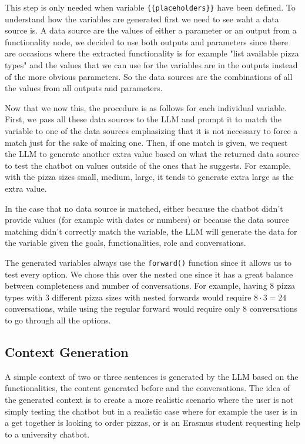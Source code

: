 This step is only needed when variable \texttt{\{\{placeholders\}\}} have been defined.
To understand how the variables are generated first we need to see waht a data source is.
A data source are the values of either a parameter or an output from a functionality node,
we decided to use both outputs and parameters since there are occasions
where the extracted functionality is for example "list available pizza types"
and the values that we can use for the variables
are in the outputs instead of the more obvious parameters.
So the data sources are the combinations of all the values
from all outputs and parameters.

Now that we now this, the procedure is as follows for each individual variable.
First, we pass all these data sources to the \ac{LLM}
and prompt it to match the variable to one of the data sources
emphasizing that it is not necessary to force a match
just for the sake of making one.
Then, if one match is given,
we request the \ac{LLM} to generate another extra value
based on what the returned data source
to test the chatbot on values outside of the ones that he suggests.
For example, with the pizza sizes small, medium, large,
it tends to generate extra large as the extra value.

In the case that no data source is matched,
either because the chatbot didn't provide values
(for example with dates or numbers)
or because the data source matching didn't correctly match the variable,
the \ac{LLM} will generate the data for the variable given
the goals, functionalities, role and conversations.

The generated variables always use the \texttt{forward()} function
since it allows us to test every option.
We chose this over the nested one
since it has a great balance between completeness and number of conversations.
For example, having $8$ pizza types with $3$ different pizza sizes
with nested forwards would require $8 \cdot 3 = 24$ conversations,
while using the regular forward would require only $8$ conversations
to go through all the options.

\subsection{Context Generation}

A simple context of two or three sentences
is generated by the \ac{LLM} based on
the functionalities, the content generated before and the conversations.
The idea of the generated context is to create a more realistic scenario
where the user is not simply testing the chatbot
but in a realistic case where for example
the user is in a get together is looking to order pizzas,
or is an Erasmus student requesting help to a university chatbot.

